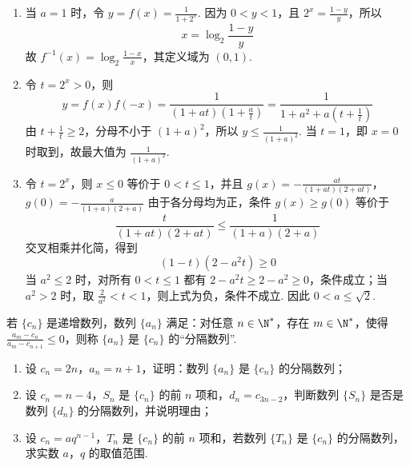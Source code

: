 \begin{solution}
\begin{enumerate}
\item 当 \(a=1\) 时，令 \(y=f(x)=\frac1{1+2^x}\). 因为 \(0<y<1\)，且 \(2^x=\frac{1-y}{y}\)，所以
\[
x=\log_2\frac{1-y}{y}
\]
故 \(f^{-1}(x)=\log_2\frac{1-x}{x}\)，其定义域为 \((0,1)\).
\item 令 \(t=2^x>0\)，则
\[
y=f(x)f(-x)=\frac1{(1+at)(1+\frac{a}{t})}=\frac1{1+a^2+a\left(t+\frac1t\right)}
\]
由 \(t+\frac1t\ge2\)，分母不小于 \((1+a)^2\)，所以 \(y\le\frac1{(1+a)^2}\). 当 \(t=1\)，即 \(x=0\) 时取到，故最大值为 \(\frac1{(1+a)^2}\).
\item 令 \(t=2^x\)，则 \(x\le0\) 等价于 \(0<t\le1\)，并且
\(g(x)=-\frac{at}{(1+at)(2+at)}\)，\(g(0)=-\frac{a}{(1+a)(2+a)}\)
由于各分母均为正，条件 \(g(x)\ge g(0)\) 等价于
\[
\frac{t}{(1+at)(2+at)}\le\frac1{(1+a)(2+a)}
\]
交叉相乘并化简，得到
\[
(1-t)(2-a^2t)\ge0
\]
当 \(a^2\le2\) 时，对所有 \(0<t\le1\) 都有 \(2-a^2t\ge2-a^2\ge0\)，条件成立；当 \(a^2>2\) 时，取 \(\frac{2}{a^2}<t<1\)，则上式为负，条件不成立. 因此 \(0<a\le\sqrt2\).
\end{enumerate}
\end{solution}

\begin{problem}
若 \(\{c_n\}\) 是递增数列，数列 \(\{a_n\}\) 满足：对任意 \(n\in\N^*\)，存在 \(m\in\N^*\)，使得 \(\frac{a_m-c_n}{a_m-c_{n+1}}\le0\)，则称 \(\{a_n\}\) 是 \(\{c_n\}\) 的“分隔数列”.

\begin{enumerate}
\item 设 \(c_n=2n\)，\(a_n=n+1\)，证明：数列 \(\{a_n\}\) 是 \(\{c_n\}\) 的分隔数列；
\item 设 \(c_n=n-4\)，\(S_n\) 是 \(\{c_n\}\) 的前 \(n\) 项和，\(d_n=c_{3n-2}\)，判断数列 \(\{S_n\}\) 是否是数列 \(\{d_n\}\) 的分隔数列，并说明理由；
\item 设 \(c_n=aq^{n-1}\)，\(T_n\) 是 \(\{c_n\}\) 的前 \(n\) 项和，若数列 \(\{T_n\}\) 是 \(\{c_n\}\) 的分隔数列，求实数 \(a\)，\(q\) 的取值范围.
\end{enumerate}
\end{problem}


